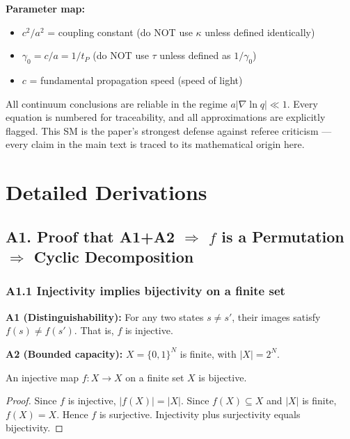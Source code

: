 \documentclass[reprint]{revtex4-2}
\begin{document}
\textbf{Parameter map:}
\begin{itemize}
\item $c^2/a^2$ = coupling constant (do NOT use $\kappa$ unless defined identically)
\item $\gamma_0 = c/a = 1/t_P$ (do NOT use $\tau$ unless defined as $1/\gamma_0$)
\item $c$ = fundamental propagation speed (speed of light)
\end{itemize}

All continuum conclusions are reliable in the regime $a|\nabla\ln q| \ll 1$. Every equation is numbered for traceability, and all approximations are explicitly flagged. This SM is the paper's strongest defense against referee criticism --- every claim in the main text is traced to its mathematical origin here.

\section{Detailed Derivations}

\subsection{A1. Proof that A1+A2 $\Rightarrow$ $f$ is a Permutation $\Rightarrow$ Cyclic Decomposition}

\subsubsection{A1.1 Injectivity implies bijectivity on a finite set}

\textbf{A1 (Distinguishability):} For any two states $s\neq s'$, their images satisfy $f(s)\neq f(s')$. That is, $f$ is injective.

\textbf{A2 (Bounded capacity):} $X=\{0,1\}^N$ is finite, with $|X|=2^N$.

\begin{theorem}[Bijectivity]
\label{thm:bijectivity}
An injective map $f:X\to X$ on a finite set $X$ is bijective.
\end{theorem}

\begin{proof}
Since $f$ is injective, $|f(X)| = |X|$. Since $f(X)\subseteq X$ and $|X|$ is finite, $f(X)=X$. Hence $f$ is surjective. Injectivity plus surjectivity equals bijectivity.
\end{proof}
\end{document}
